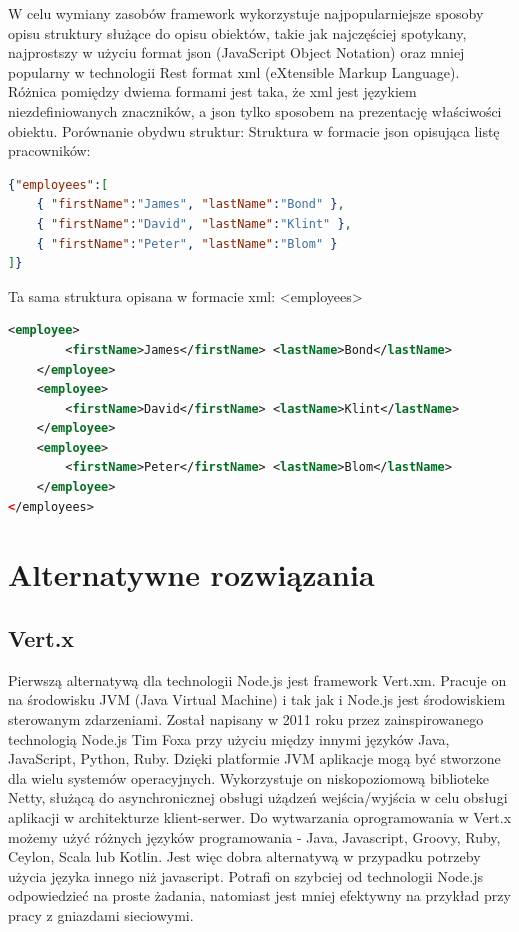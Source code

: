 \documentclass[12pt]{report}
\begin{document}
W celu wymiany zasobów framework wykorzystuje najpopularniejsze sposoby opisu struktury służące do opisu obiektów, takie jak najczęściej spotykany, najprostszy w użyciu format json (JavaScript Object Notation) oraz mniej popularny w technologii Rest format xml (eXtensible Markup Language). 
Różnica pomiędzy dwiema formami jest taka, że xml jest językiem niezdefiniowanych znaczników, a json tylko sposobem na prezentację właściwości obiektu. 
Porównanie obydwu struktur:
Struktura w formacie json opisująca listę pracowników:
\begin{lstlisting}[language=json,firstnumber=1]
{"employees":[
	{ "firstName":"James", "lastName":"Bond" },
	{ "firstName":"David", "lastName":"Klint" },
	{ "firstName":"Peter", "lastName":"Blom" }
]}
\end{lstlisting}

Ta sama struktura opisana w formacie xml:
<employees>
\begin{lstlisting}[language=XML,firstnumber=1]
	<employee>
		<firstName>James</firstName> <lastName>Bond</lastName>
	</employee>
	<employee>
		<firstName>David</firstName> <lastName>Klint</lastName>
	</employee>
	<employee>
		<firstName>Peter</firstName> <lastName>Blom</lastName>
	</employee>
</employees>
\end{lstlisting}

\section{Alternatywne rozwiązania}
\subsection{Vert.x}
Pierwszą alternatywą dla technologii Node.js jest framework Vert.xm.
Pracuje on na środowisku JVM (Java Virtual Machine) i tak jak i Node.js jest środowiskiem sterowanym zdarzeniami.
Został napisany w 2011 roku przez zainspirowanego technologią Node.js Tim Foxa przy użyciu między innymi języków Java, JavaScript, Python, Ruby.
Dzięki platformie JVM aplikacje mogą być stworzone dla wielu systemów operacyjnych.
Wykorzystuje on niskopoziomową biblioteke Netty, służącą do asynchronicznej obsługi użądzeń wejścia/wyjścia w celu obsługi aplikacji w architekturze klient-serwer.
Do wytwarzania oprogramowania w Vert.x możemy użyć różnych języków programowania - Java, Javascript, Groovy, Ruby, Ceylon, Scala lub Kotlin.
Jest więc dobra alternatywą w przypadku potrzeby użycia języka innego niż javascript.
Potrafi on szybciej od technologii Node.js odpowiedzieć na proste żadania, natomiast jest mniej efektywny na przykład przy pracy z gniazdami sieciowymi.
\end{document}
